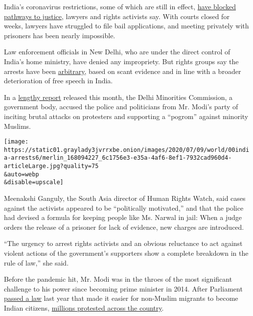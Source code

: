 India's coronavirus restrictions, some of which are still in effect,
\href{https://www.hrw.org/news/2020/06/15/india-end-bias-prosecuting-delhi-violence}{have
blocked pathways to justice}, lawyers and rights activists say. With
courts closed for weeks, lawyers have struggled to file bail
applications, and meeting privately with prisoners has been nearly
impossible.

Law enforcement officials in New Delhi, who are under the direct control
of India's home ministry, have denied any impropriety. But rights groups
say the arrests have been
\href{https://www.fidh.org/en/issues/human-rights-defenders/india-arbitrary-detention-of-several-defenders-for-protesting-against}{arbitrary},
based on scant evidence and in line with a broader deterioration of free
speech in India.

In a
\href{http://muslimmirror.com/eng/kapil-mishras-provocative-speech-responsible-for-delhi-violence-says-minorities-commission-report/}{lengthy
report} released this month, the Delhi Minorities Commission, a
government body, accused the police and politicians from Mr. Modi's
party of inciting brutal attacks on protesters and supporting a
``pogrom'' against minority Muslims.

\texttt{[image: https://static01.graylady3jvrrxbe.onion/images/2020/07/09/world/00india-arrests6/merlin\_168094227\_6c1756e3-e35a-4af6-8ef1-7932cad960d4-articleLarge.jpg?quality=75\\\&auto=webp\\\&disable=upscale]}

Meenakshi Ganguly, the South Asia director of Human Rights Watch, said
cases against the activists appeared to be ``politically motivated,''
and that the police had devised a formula for keeping people like Ms.
Narwal in jail: When a judge orders the release of a prisoner for lack
of evidence, new charges are introduced.

``The urgency to arrest rights activists and an obvious reluctance to
act against violent actions of the government's supporters show a
complete breakdown in the rule of law,'' she said.

Before the pandemic hit, Mr. Modi was in the throes of the most
significant challenge to his power since becoming prime minister in
2014. After Parliament
\href{https://www.nytimes3xbfgragh.onion/2019/12/11/world/asia/india-muslims-citizenship-narendra-modi.html}{passed
a law} last year that made it easier for non-Muslim migrants to become
Indian citizens,
\href{https://www.nytimes3xbfgragh.onion/2019/12/16/world/asia/india-citizenship-protests.html}{millions
protested across the country}.

